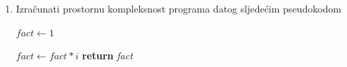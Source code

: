 \begin{enumerate}
\item Izračunati prostornu kompleksnost programa datog sljedećim pseudokodom
 
\begin{algorithm}[H]
	\begin{algorithmic}[1]
	  	\State $fact \gets 1$
	  	   
	  	   \State	$fact \gets fact * i$
	  	 \EndFor
	  	\State \textbf{return} \textit{fact}
	  \EndProcedure
	\end{algorithmic}
\end{algorithm}
 


\end{enumerate}